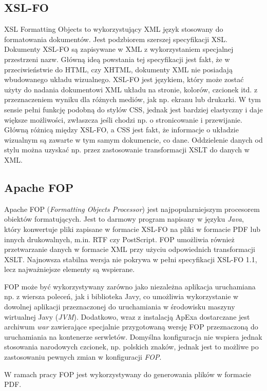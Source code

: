 \documentclass[11pt,a4paper]{article}
\begin{document}
\subsection{XSL-FO} \label{tools:xslfo}
XSL Formatting Objects to wykorzystujący XML język stosowany do formatowania dokumentów. Jest podzbiorem szerszej specyfikacji XSL. Dokumenty XSL-FO są zapisywane w XML z wykorzystaniem specjalnej przestrzeni nazw. Główną ideą powstania tej specyfikacji jest fakt, że w przeciwieństwie do HTML, czy XHTML, dokumenty XML nie posiadają wbudowanego układu wizualnego. XSL-FO jest językiem, który może zostać użyty do nadania dokumentowi XML układu na stronie, kolorów, czcionek itd. z przeznaczeniem wyniku dla różnych mediów, jak np. ekranu lub drukarki. W tym sensie pełni funkcję podobną do stylów CSS, jednak jest bardziej elastyczny i daje większe możliwości, zwłaszcza jeśli chodzi np. o stronicowanie i przewijanie. Główną różnicą między XSL-FO, a CSS jest fakt, że informacje o układzie wizualnym są zawarte w tym samym dokumencie, co dane. Oddzielenie danych od stylu można uzyskać np. przez zastosowanie transformacji XSLT do danych w XML.

\subsection{Apache FOP} \label{tools:fop}
Apache FOP (\emph{Formatting Objects Processor}) jest najpopularniejszym procesorem obiektów formatujących. Jest to darmowy program napisany w języku \emph{Java}, który konwertuje pliki zapisane w formacie XSL-FO na pliki w formacie PDF lub innych drukowalnych, m.in. RTF czy PostScript. FOP umożliwia również przetwarzanie danych w formacie XML przy użyciu odpowiednich transformacji XSLT. Najnowsza stabilna wersja nie pokrywa w pełni specyfikacji XSL-FO 1.1, lecz najważniejsze elementy są wspierane.

FOP może być wykorzystywany zarówno jako niezależna aplikacja uruchamiana np. z wiersza poleceń, jak i biblioteka Javy, co umożliwia wykorzystanie w dowolnej aplikacji przeznaczonej do uruchamiania w środowisku maszyny wirtualnej Javy (\emph{JVM}). Dodatkowo, wraz z instalacją ApExa dostarczane jest archiwum \emph{war} zawierające specjalnie przygotowaną wersję FOP przeznaczoną do uruchamiania na kontenerze serwletów. Domyślna konfiguracja nie wspiera jednak stosowania narodowych czcionek, np. polskich znaków, jednak jest to możliwe po zastosowaniu pewnych zmian w konfiguracji \emph{FOP}. 

W ramach pracy FOP jest wykorzystywany do generowania plików w formacie PDF.
\end{document}
